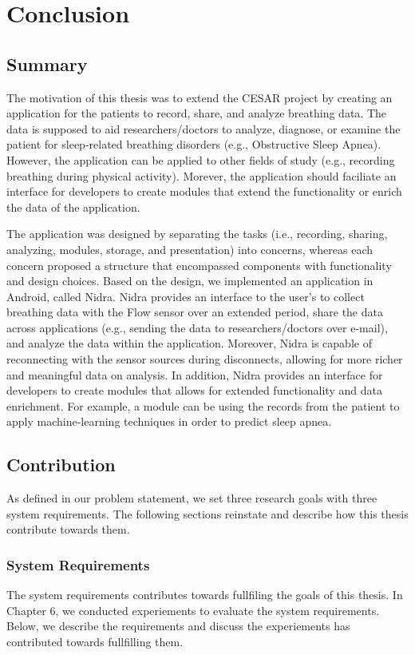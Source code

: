 \chapter{Conclusion}

\section{Summary}
The motivation of this thesis was to extend the CESAR project by creating an application for the patients to record, share, and analyze breathing data. The data is supposed to aid researchers/doctors to analyze, diagnose, or examine the patient for sleep-related breathing disorders (e.g., Obstructive Sleep Apnea). However, the application can be applied to other fields of study (e.g., recording breathing during physical activity). Morever, the application should faciliate an interface for developers to create modules that extend the functionality or enrich the data of the application.

The application was designed by separating the tasks (i.e., recording, sharing, analyzing, modules, storage, and presentation) into concerns, whereas each concern proposed a structure that encompassed components with functionality and design choices. Based on the design, we implemented an application in Android, called Nidra. Nidra provides an interface to the user's to collect breathing data with the Flow sensor over an extended period, share the data across applications (e.g., sending the data to researchers/doctors over e-mail), and analyze the data within the application. Moreover, Nidra is capable of reconnecting with the sensor sources during disconnects, allowing for more richer and meaningful data on analysis. In addition, Nidra provides an interface for developers to create modules that allows for extended functionality and data enrichment. For example, a module can be using the records from the patient to apply machine-learning techniques in order to predict sleep apnea. 



\section{Contribution}
 As defined in our problem statement, we set three research goals with three system requirements. The following sections reinstate and describe how this thesis contribute towards them.

\subsection{System Requirements}
The system requirements contributes towards fullfiling the goals of this thesis. In Chapter 6, we conducted experiements to evaluate the system requirements. Below, we describe the requirements and discuss the experiements has contributed towards fullfilling them. 

